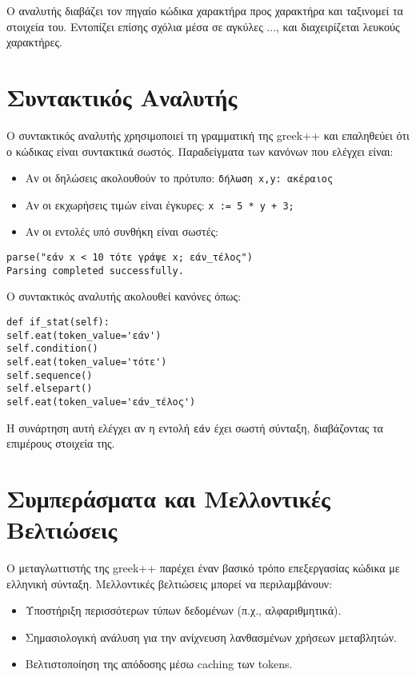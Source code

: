 \documentclass[12pt,a4paper]{article}
\begin{document}
Ο αναλυτής διαβάζει τον πηγαίο κώδικα χαρακτήρα προς χαρακτήρα και ταξινομεί τα στοιχεία του. Εντοπίζει επίσης σχόλια μέσα σε αγκύλες {...}, και διαχειρίζεται λευκούς χαρακτήρες.


\section{Συντακτικός Αναλυτής}
Ο συντακτικός αναλυτής χρησιμοποιεί τη γραμματική της greek++ και επαληθεύει ότι ο κώδικας είναι συντακτικά σωστός. Παραδείγματα των κανόνων που ελέγχει είναι:


\begin{itemize}
\item Αν οι δηλώσεις ακολουθούν το πρότυπο: \texttt{δήλωση x,y: ακέραιος}
\item Αν οι εκχωρήσεις τιμών είναι έγκυρες: \texttt{x := 5 * y + 3;}
\item Αν οι εντολές υπό συνθήκη είναι σωστές:
\end{itemize}


\begin{Verbatim}[frame=single, fontsize=\small]
parse("εάν x < 10 τότε γράψε x; εάν_τέλος")
Parsing completed successfully.
\end{Verbatim}





Ο συντακτικός αναλυτής ακολουθεί κανόνες όπως:


\begin{Verbatim}[frame=single, fontsize=\small]
def if_stat(self):
self.eat(token_value='εάν')
self.condition()
self.eat(token_value='τότε')
self.sequence()
self.elsepart()
self.eat(token_value='εάν_τέλος')
\end{Verbatim}


Η συνάρτηση αυτή ελέγχει αν η εντολή \texttt{εάν} έχει σωστή σύνταξη, διαβάζοντας τα επιμέρους στοιχεία της.


\section{Συμπεράσματα και Μελλοντικές Βελτιώσεις}
Ο μεταγλωττιστής της greek++ παρέχει έναν βασικό τρόπο επεξεργασίας κώδικα με ελληνική σύνταξη. Μελλοντικές βελτιώσεις μπορεί να περιλαμβάνουν:
\begin{itemize}
\item Υποστήριξη περισσότερων τύπων δεδομένων (π.χ., αλφαριθμητικά).
\item Σημασιολογική ανάλυση για την ανίχνευση λανθασμένων χρήσεων μεταβλητών.
\item Βελτιστοποίηση της απόδοσης μέσω caching των tokens.
\end{itemize}
\end{document}
